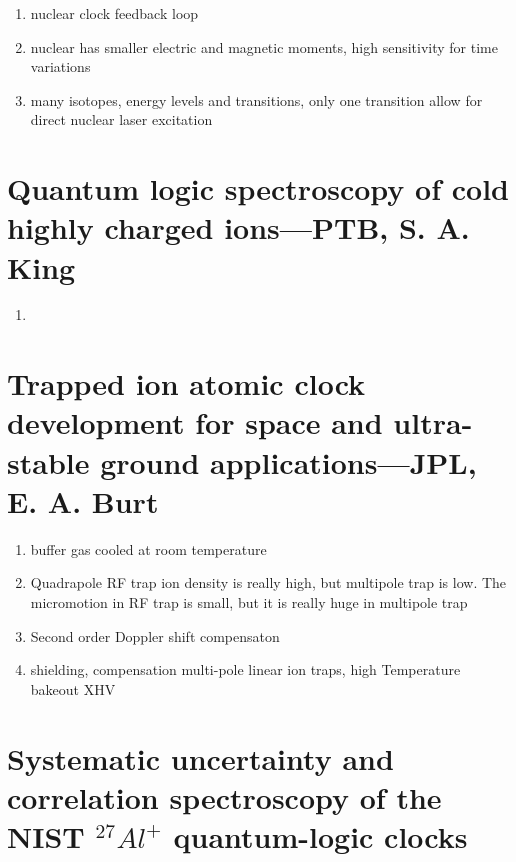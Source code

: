 \begin{enumerate}
    \item nuclear clock feedback loop
    \item nuclear has smaller electric and magnetic moments, high sensitivity for time variations
    \item many isotopes, energy levels and transitions, only one transition allow for direct nuclear laser excitation
\end{enumerate}


\section{Quantum logic spectroscopy of cold highly charged ions---PTB, S. A. King} %
\label{sec:quantum_logic_spectroscopy_of_cold_highly_charged_ions_ptb_s_a_king}



\begin{enumerate}
    \item
\end{enumerate}



\section{Trapped ion atomic clock development for space and ultra-stable ground applications---JPL, E. A. Burt} %
\label{sec:trapped_ion_atomic_clock_development_for_space_and_ultra_stable_ground_applications_jpl_e_a_burt}


\begin{enumerate}
    \item buffer gas cooled at room temperature
    \item Quadrapole RF trap ion density is really high, but multipole trap is low. The micromotion in RF trap is small, but it is really huge in multipole trap
    \item Second order Doppler shift compensaton
    \item shielding, compensation multi-pole linear ion traps, high Temperature bakeout XHV
\end{enumerate}


\section{Systematic uncertainty and correlation spectroscopy
of the NIST $^{27}Al^+$ quantum-logic clocks} %
\label{sec:systematic_uncertainty_and_correlation_spectroscopy_of_the_nist_27al_quantum_logic_clocks}


